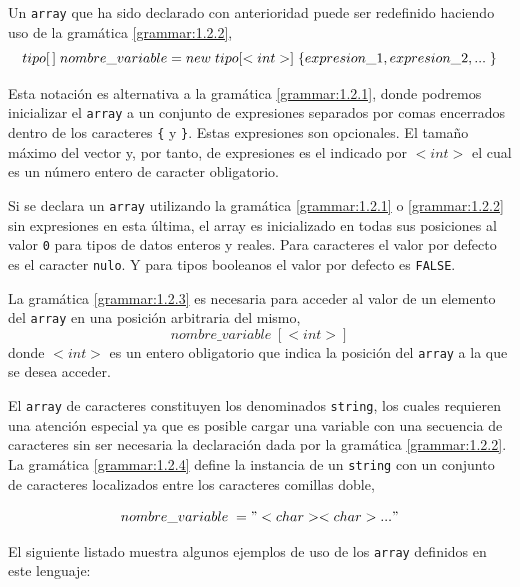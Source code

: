 \documentclass[11pt, english]{article}
\begin{document}
Un \texttt{array} que ha sido declarado con anterioridad puede ser redefinido haciendo uso de la gramática \ref{grammar:1.2.2},
	\begin{equation}\label{grammar:1.2.2}
	tipo[ \, ]\; nombre\_variable = new\; tipo[<int>]\; \{ \\
	expresion\_1, expresion\_2, ...\;\}
	\end{equation}

Esta notación es alternativa a la gramática \ref{grammar:1.2.1}, donde podremos inicializar el \texttt{array} a un conjunto de expresiones separados por comas encerrados dentro de los caracteres \texttt{\{} y \texttt{\}}. Estas expresiones son opcionales. El tamaño máximo del vector y, por tanto, de expresiones es el indicado por $<int>$ el cual es un número entero de caracter obligatorio.

Si se declara un \texttt{array} utilizando la gramática \ref{grammar:1.2.1} o \ref{grammar:1.2.2} sin expresiones en esta última, el array es inicializado en todas sus posiciones al valor \texttt{0} para tipos de datos enteros y reales. Para caracteres el valor por defecto es el caracter \texttt{nulo}. Y para tipos booleanos el valor por defecto es \texttt{FALSE}.

La gramática \ref{grammar:1.2.3} es necesaria para acceder al valor de un elemento del \texttt{array} en una posición arbitraria del mismo,
	\begin{equation}\label{grammar:1.2.3}
	nombre\_variable\; [<int>]
	\end{equation}
donde $<int>$ es un entero obligatorio que indica la posición del \texttt{array} a la que se desea acceder.

El \texttt{array} de caracteres constituyen los denominados \texttt{string}, los cuales requieren una atención especial ya que es posible cargar una variable con una secuencia de caracteres sin ser necesaria la declaración dada por la gramática \ref{grammar:1.2.2}. La gramática \ref{grammar:1.2.4} define la instancia de un \texttt{string} con un conjunto de caracteres localizados entre los caracteres comillas doble,

	\begin{equation}\label{grammar:1.2.4}
	nombre\_variable\; = " <char><char>..."
	\end{equation}

El siguiente listado muestra algunos ejemplos de uso de los \texttt{array} definidos en este lenguaje:


\end{document}
